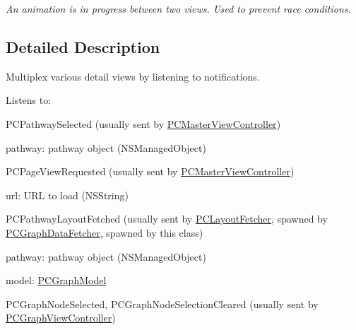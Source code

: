 \begin{Indent}
\begin{DoxyCompactItemize}
\begin{DoxyCompactList}\small\item\em An animation is in progress between two views. Used to prevent race conditions. \end{DoxyCompactList}\end{DoxyCompactItemize}
\end{Indent}


\subsection{Detailed Description}
Multiplex various detail views by listening to notifications. 

Listens to:


\begin{DoxyItemize}
\item PCPathwaySelected (usually sent by \hyperlink{interface_p_c_master_view_controller}{PCMasterViewController})
\begin{DoxyItemize}
\item pathway: pathway object (NSManagedObject)
\end{DoxyItemize}
\end{DoxyItemize}


\begin{DoxyItemize}
\item PCPageViewRequested (usually sent by \hyperlink{interface_p_c_master_view_controller}{PCMasterViewController})
\begin{DoxyItemize}
\item url: URL to load (NSString)
\end{DoxyItemize}
\end{DoxyItemize}


\begin{DoxyItemize}
\item PCPathwayLayoutFetched (usually sent by \hyperlink{interface_p_c_layout_fetcher}{PCLayoutFetcher}, spawned by \hyperlink{interface_p_c_graph_data_fetcher}{PCGraphDataFetcher}, spawned by this class)
\begin{DoxyItemize}
\item pathway: pathway object (NSManagedObject)
\item model: \hyperlink{interface_p_c_graph_model}{PCGraphModel}
\end{DoxyItemize}
\end{DoxyItemize}


\begin{DoxyItemize}
\item PCGraphNodeSelected, PCGraphNodeSelectionCleared (usually sent by \hyperlink{interface_p_c_graph_view_controller}{PCGraphViewController}) 
\end{DoxyItemize}

